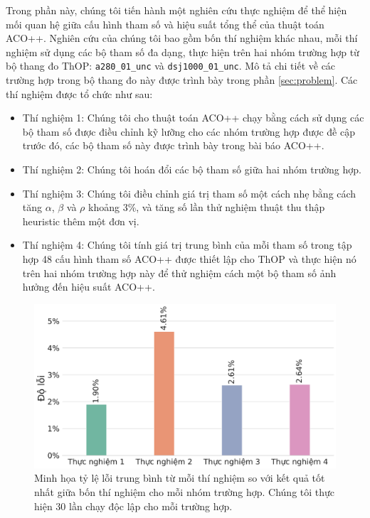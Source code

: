Trong phần này, chúng tôi tiến hành một nghiên cứu thực nghiệm để thể hiện mối quan hệ giữa cấu hình tham số và hiệu suất tổng thể của thuật toán ACO++. Nghiên cứu của chúng tôi bao gồm bốn thí nghiệm khác nhau, mỗi thí nghiệm sử dụng các bộ tham số đa dạng, thực hiện trên hai nhóm trường hợp từ bộ thang đo ThOP: \texttt{a280\_01\_unc} và \texttt{dsj1000\_01\_unc}. Mô tả chi tiết về các trường hợp trong bộ thang đo này được trình bày trong phần \ref{sec:problem}. Các thí nghiệm được tổ chức như sau:
\begin{itemize}
    \item Thí nghiệm 1: Chúng tôi cho thuật toán ACO++ chạy bằng cách sử dụng các bộ tham số được điều chỉnh kỹ lưỡng cho các nhóm trường hợp được đề cập trước đó, các bộ tham số này được trình bày trong bài báo ACO++.
    \item Thí nghiệm 2: Chúng tôi hoán đổi các bộ tham số giữa hai nhóm trường hợp.
    \item Thí nghiệm 3: Chúng tôi điều chỉnh giá trị tham số một cách nhẹ bằng cách tăng $\alpha$, $\beta$ và $\rho$ khoảng 3\%, và tăng số lần thử nghiệm thuật thu thập heuristic thêm một đơn vị.
    \item Thí nghiệm 4: Chúng tôi tính giá trị trung bình của mỗi tham số trong tập hợp 48 cấu hình tham số ACO++ được thiết lập cho ThOP và thực hiện nó trên hai nhóm trường hợp này để thử nghiệm cách một bộ tham số ảnh hưởng đến hiệu suất ACO++.
\end{itemize}


\begin{figure}[ht!]
    \centering
    \includegraphics[width=\textwidth]{Figures/sensitive_error_rate.pdf}
    \caption[Minh họa tỷ lệ lỗi trung bình của các thí nghiệm ACO++ với các bộ siêu tham số khác nhau.]{Minh họa tỷ lệ lỗi trung bình từ mỗi thí nghiệm so với kết quả tốt nhất giữa bốn thí nghiệm cho mỗi nhóm trường hợp. Chúng tôi thực hiện 30 lần chạy độc lập cho mỗi trường hợp.}
    \label{fig:ACO++Sensitive}
\end{figure}

